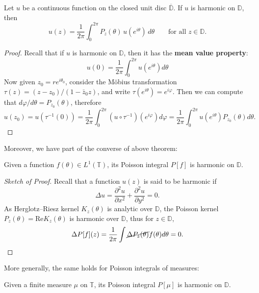 \begin{theorem}\label{Poisson integral formula}
Let $u$ be a continuous function on the closed unit disc $\overline{\mathbb{D}}$. If $u$ is
harmonic on $\mathbb{D}$, then
\begin{equation*}
  u(z)=\frac{1}{2\pi}\int_0^{2\pi} P_z(\theta)\, u(e^{i\theta})\, d\theta
  \qquad \text{for all } z\in\mathbb{D}.
\end{equation*}
\end{theorem}
\begin{proof}
Recall that if $u$ is harmonic on $\mathbb{D}$, then it has the 
\textbf{mean value property}: 
\begin{equation*}
  u(0)=\frac{1}{2\pi}\int_0^{2\pi} u(e^{i\theta})d\theta
\end{equation*}
Now given $z_0=re^{i\theta_0}$, consider the M\"{o}bius transformation 
$\tau(z)=(z-z_0)/(1-\bar{z}_0 z)$, and write $\tau(e^{i\theta})=e^{i\varphi}$.
Then we can compute that $d\varphi/d\theta=P_{z_0}(\theta)$, therefore
\begin{equation*}
  u(z_0)=u(\tau^{-1}(0))=\frac{1}{2\pi}\int_0^{2\pi} (u\circ\tau^{-1})(e^{i\varphi})
  d\varphi=\frac{1}{2\pi}\int_0^{2\pi} u(e^{i\theta})P_{z_0}(\theta)d\theta.
\end{equation*}
\end{proof}
Moreover, we have part of the converse of above theorem:
\begin{theorem}\label{Poisson integral of L^1 is harmonic}
Given a function $f(\theta)\in L^1(\mathbb{T})$, its Poisson integral $P[f]$
is harmonic on $\mathbb{D}$.
\end{theorem}
\begin{proof}[Sketch of Proof]
Recall that a function $u(z)$ is said to be harmonic if 
\begin{equation*}
  \Delta u=\frac{\partial^2 u}{\partial x^2}+\frac{\partial^2 u}{\partial y^2}=0.
\end{equation*}
As Herglotz--Riesz kernel $K_z(\theta)$ is analytic over $\mathbb{D}$, 
the Poisson kernel $P_z(\theta)=\text{Re} K_z(\theta)$ is harmonic over 
$\mathbb{D}$, thus for $z\in \mathbb{D}$,
\begin{equation*}
  \Delta P[f](z)=\frac{1}{2\pi}\int \cancel{\Delta P_z(\theta)} f(\theta)d\theta=0.
\end{equation*}
\end{proof}
More generally, the same holds for Poisson integrals of measures:
\begin{theorem}
Given a finite measure $\mu$ on $\mathbb{T}$, its Poisson integral $P[\mu]$
is harmonic on $\mathbb{D}$.
\end{theorem}
